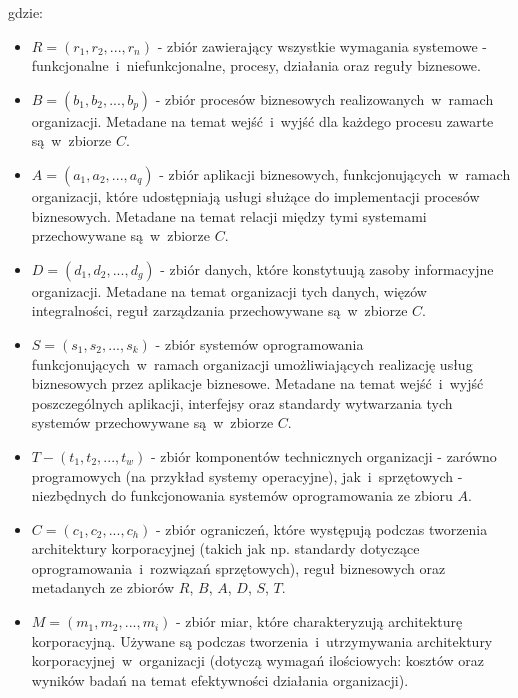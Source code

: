 gdzie:
\begin{itemize}
\item{$R = (r_{1}, r_{2},..., r_{n})$ - zbiór zawierający wszystkie wymagania systemowe - funkcjonalne~i~niefunkcjonalne, procesy, działania oraz reguły biznesowe.}
\item{$B = (b_{1}, b_{2},..., b_{p})$ - zbiór procesów biznesowych realizowanych~w~ramach organizacji. Metadane na temat wejść~i~wyjść dla każdego procesu zawarte są~w~zbiorze $C$.}
\item{$A = (a_{1}, a_{2},..., a_{q})$ - zbiór aplikacji biznesowych, funkcjonujących~w~ramach organizacji, które udostępniają usługi służące do implementacji procesów biznesowych. Metadane na temat relacji między tymi systemami przechowywane są~w~zbiorze $C$.}
\item{$D = (d_{1}, d_{2},..., d_{g})$ - zbiór danych, które konstytuują zasoby informacyjne organizacji. Metadane na temat organizacji tych danych, więzów integralności, reguł zarządzania przechowywane są~w~zbiorze $C$.}
\item{$S = (s_{1}, s_{2},..., s_{k})$ - zbiór systemów oprogramowania funkcjonujących~w~ramach organizacji umożliwiających realizację usług biznesowych przez aplikacje biznesowe. Metadane na temat wejść~i~wyjść poszczególnych aplikacji, interfejsy oraz standardy wytwarzania tych systemów przechowywane są~w~zbiorze $C$.}
\item{$T - (t_{1}, t_{2},..., t_{w})$ - zbiór komponentów technicznych organizacji - zarówno programowych (na przykład systemy operacyjne), jak~i~sprzętowych - niezbędnych do funkcjonowania systemów oprogramowania ze zbioru $A$.}
\item{$C = (c_{1}, c_{2},..., c_{h})$ - zbiór ograniczeń, które występują podczas tworzenia architektury korporacyjnej (takich jak np. standardy dotyczące oprogramowania~i~rozwiązań sprzętowych), reguł biznesowych oraz metadanych ze zbiorów $R$, $B$, $A$, $D$, $S$, $T$.}
\item{$M = (m_{1}, m_{2},..., m_{i})$ - zbiór miar, które charakteryzują architekturę korporacyjną. Używane są podczas tworzenia~i~utrzymywania architektury korporacyjnej~w~organizacji (dotyczą wymagań ilościowych: kosztów oraz wyników badań na temat efektywności działania organizacji).}
\end{itemize}

